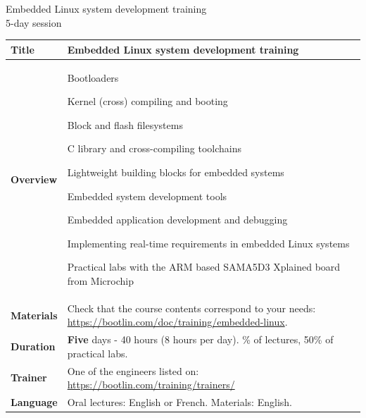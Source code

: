 \documentclass[a4paper,12pt,obeyspaces,spaces,hyphens]{article}
\begin{document}
\thispagestyle{fancy}

\setlength{\arrayrulewidth}{0.8pt}

\begin{center}
\LARGE
Embedded Linux system development training\\
\large
5-day session
\end{center}
\vspace{1cm}

\small
{}

 {
  \begin{tabularx}{\textwidth}{|g|h|}
    {\bf Title} & {\bf Embedded Linux system development training} \\
    \hline

    {\bf Overview} &
    Bootloaders \par
    Kernel (cross) compiling and booting \par
    Block and flash filesystems \par
    C library and cross-compiling toolchains \par
    Lightweight building blocks for embedded systems \par
    Embedded system development tools \par
    Embedded application development and debugging \par
    Implementing real-time requirements in embedded Linux systems \par
    Practical labs with the ARM based SAMA5D3 Xplained board from
        Microchip \\
    \hline
    {\bf Materials} &
    Check that the course contents correspond to your needs:
    \newline \url{https://bootlin.com/doc/training/embedded-linux}. \\
    \hline

    {\bf Duration} & {\bf Five} days - 40 hours (8 hours per day).
    \% of lectures, 50\% of practical labs. \\
    \hline

    {\bf Trainer} & One of the engineers listed on:
    \newline \url{https://bootlin.com/training/trainers/}\\
    \hline

    {\bf Language} & Oral lectures: English or French.
    \newline Materials: English.\\
    \hline


\end{tabularx}}
\end{document}
